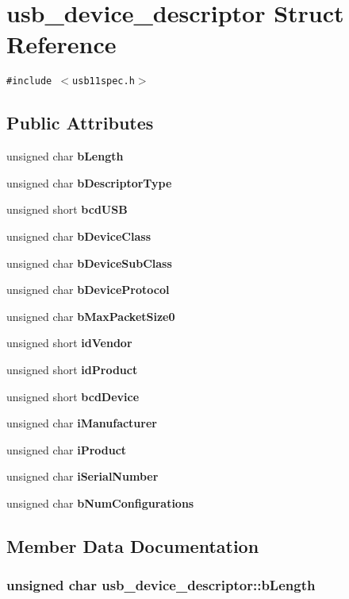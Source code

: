\section{usb\_\-device\_\-descriptor Struct Reference}
\label{structusb__device__descriptor}
{\tt \#include $<$usb11spec.h$>$}

\subsection*{Public Attributes}
\begin{CompactItemize}
\item 
unsigned char {\bf b\-Length}
\item 
unsigned char {\bf b\-Descriptor\-Type}
\item 
unsigned short {\bf bcd\-USB}
\item 
unsigned char {\bf b\-Device\-Class}
\item 
unsigned char {\bf b\-Device\-Sub\-Class}
\item 
unsigned char {\bf b\-Device\-Protocol}
\item 
unsigned char {\bf b\-Max\-Packet\-Size0}
\item 
unsigned short {\bf id\-Vendor}
\item 
unsigned short {\bf id\-Product}
\item 
unsigned short {\bf bcd\-Device}
\item 
unsigned char {\bf i\-Manufacturer}
\item 
unsigned char {\bf i\-Product}
\item 
unsigned char {\bf i\-Serial\-Number}
\item 
unsigned char {\bf b\-Num\-Configurations}
\end{CompactItemize}


\subsection{Member Data Documentation}
\subsubsection{\setlength{\rightskip}{0pt plus 5cm}unsigned char {\bf usb\_\-device\_\-descriptor::b\-Length}}\label{structusb__device__descriptor_87b23e33e15e50fc14b10353dafcd728}


